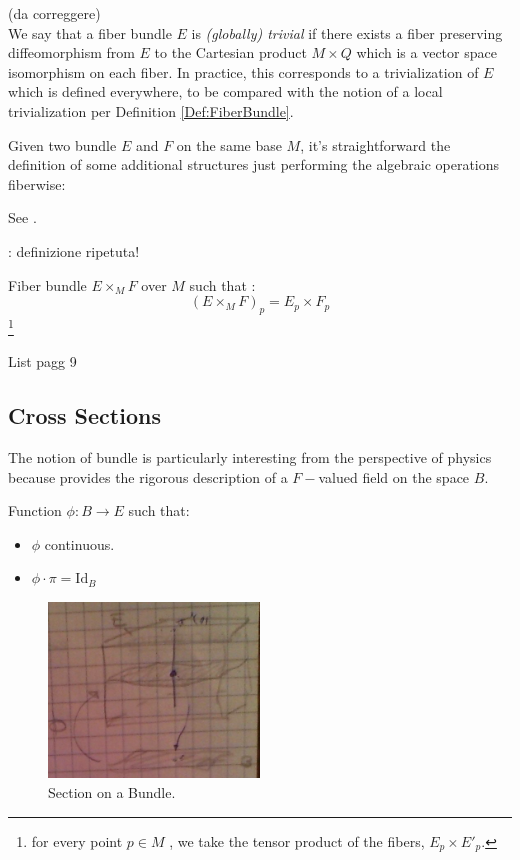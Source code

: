 \documentclass[a4paper,12pt]{scrartcl}    %
\begin{document}
\begin{notationfix}
	\danger(da correggere)\\
	We say that a fiber bundle $E$ is \emph{(globally) trivial} if there exists a fiber preserving diffeomorphism from $E$ to the Cartesian product $M×Q$ which is a vector space isomorphism on each fiber. 
	In practice, this corresponds to a trivialization of $E$ which is defined everywhere, to be compared with the notion of a local trivialization per Definition \ref{Def:FiberBundle}. 
\end{notationfix}

Given two bundle $E$ and $F$ on the same base $M$, it's straightforward the definition of some additional structures just performing the algebraic operations fiberwise:
\begin{definition}
	See  \cite{advances}.
\end{definition}
\danger : definizione ripetuta!
\begin{definition}
	Fiber bundle $E \times_M F$ over $M$ such that :
	\begin{displaymath}
		(E \times_M F )_p = E_p \times F_p
	\end{displaymath}
	\footnote{for every point $p\in M$ , we take the tensor product of the fibers, $E_p \times E'_p$.}
\end{definition}

\begin{Warning}
	List pagg 9 \cite{primer}
\end{Warning}


\subsection{Cross Sections}
The notion of bundle is particularly interesting from the perspective of physics because provides the rigorous description of a $F-$valued field on the space $B$.

\begin{definition}
Function $\phi : B \rightarrow E$ such that:
\begin{itemize}
\item $\phi$ continuous.
\item $\phi \cdot \pi = \textrm{Id}_{B}$ 
\end{itemize}
\end{definition}

\begin{figure}[h!]
  \caption{Section on a Bundle.}
  	\includegraphics[width=0.5\textwidth]{TempPictures/CrossSection.jpg}
  \centering
\end{figure}
\end{document}
